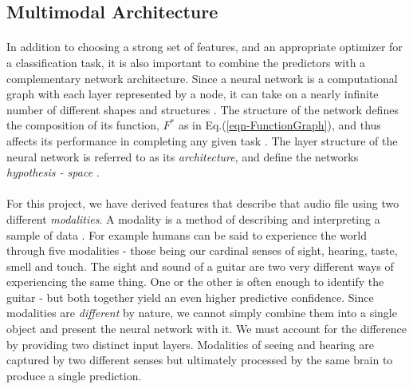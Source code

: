 \documentclass[12pt,letterpaper]{article}
\begin{document}

\subsection{Multimodal Architecture}
\label{subsec-Architecture}

\paragraph*{}In addition to choosing a strong set of features, and an appropriate optimizer for a classification task, it is also important to combine the predictors with a complementary network architecture. Since a neural network is a computational graph with each layer represented by a node, it can take on a nearly infinite number of different shapes and structures \cite{Goodfellow,Virtanen}. The structure of the network defines the composition of its function, $F^*$ as in Eq.(\ref{eqn-FunctionGraph}), and thus affects its performance in completing any given task \cite{Geron}. The layer structure of the neural network is referred to as its \textit{architecture}, and define the networks \textit{hypothesis - space} \cite{Goodfellow}. 

\paragraph*{}For this project, we have derived features that describe that audio file using two different \textit{modalities}. A modality is a method of describing and interpreting a sample of data \cite{Ngiam}. For example humans can be said to experience the world through five modalities - those being our cardinal senses of sight, hearing, taste, smell and touch. The sight and sound of a guitar are two very different ways of experiencing the same thing. One or the other is often enough to identify the guitar - but both together yield an even higher predictive confidence. Since modalities are \textit{different} by nature, we cannot simply combine them into a single object and present the neural network with it. We must account for the difference by providing two distinct input layers.  Modalities of seeing and hearing are captured by two different senses but ultimately processed by the same brain to produce a single prediction.
\end{document}
